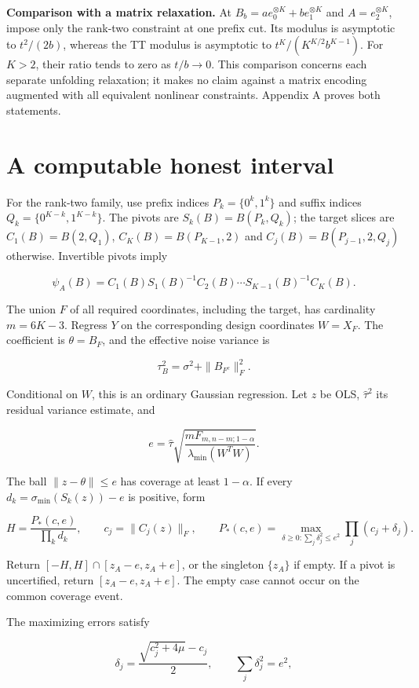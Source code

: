 \documentclass[
  11pt,
]{article}
\begin{document}
\textbf{Comparison with a matrix relaxation.} At
\(B_b=a e_0^{\otimes K}+b e_1^{\otimes K}\) and \(A=e_2^{\otimes K}\),
impose only the rank-two constraint at one prefix cut. Its modulus is
asymptotic to \(t^2/(2b)\), whereas the TT modulus is asymptotic to
\(t^K/(K^{K/2}b^{K-1})\). For \(K>2\), their ratio tends to zero as
\(t/b\to0\). This comparison concerns each separate unfolding
relaxation; it makes no claim against a matrix encoding augmented with
all equivalent nonlinear constraints. Appendix A proves both statements.

\section{A computable honest
interval}\label{a-computable-honest-interval}

For the rank-two family, use prefix indices \(P_k=\{0^k,1^k\}\) and
suffix indices \(Q_k=\{0^{K-k},1^{K-k}\}\). The pivots are
\(S_k(B)=B(P_k,Q_k)\); the target slices are \(C_1(B)=B(2,Q_1)\),
\(C_K(B)=B(P_{K-1},2)\) and \(C_j(B)=B(P_{j-1},2,Q_j)\) otherwise.
Invertible pivots imply

\[
\psi_A(B)=C_1(B)S_1(B)^{-1}C_2(B)\cdots
S_{K-1}(B)^{-1}C_K(B).
\]

The union \(F\) of all required coordinates, including the target, has
cardinality \(m=6K-3\). Regress \(Y\) on the corresponding design
coordinates \(W=X_F\). The coefficient is \(\theta=B_F\), and the
effective noise variance is

\[
\tau_B^2=\sigma^2+\|B_{F^c}\|_F^2.
\]

Conditional on \(W\), this is an ordinary Gaussian regression. Let \(z\)
be OLS, \(\widehat\tau^2\) its residual variance estimate, and

\[
e=\widehat\tau
\sqrt{\frac{m F_{m,n-m;1-\alpha}}{\lambda_{\min}(W^TW)}}.
\]

The ball \(\|z-\theta\|\le e\) has coverage at least \(1-\alpha\). If
every \(d_k=\sigma_{\min}(S_k(z))-e\) is positive, form

\[
H=\frac{P_*(c,e)}{\prod_kd_k},\qquad
c_j=\|C_j(z)\|_F,\qquad
P_*(c,e)=\max_{\delta\ge0:\sum_j\delta_j^2\le e^2}
\prod_j(c_j+\delta_j).
\]

Return \([-H,H]\cap[z_A-e,z_A+e]\), or the singleton \(\{z_A\}\) if
empty. If a pivot is uncertified, return \([z_A-e,z_A+e]\). The empty
case cannot occur on the common coverage event.

The maximizing errors satisfy

\[
\delta_j=\frac{\sqrt{c_j^2+4\mu}-c_j}{2},\qquad
\sum_j\delta_j^2=e^2,
\]
\end{document}
